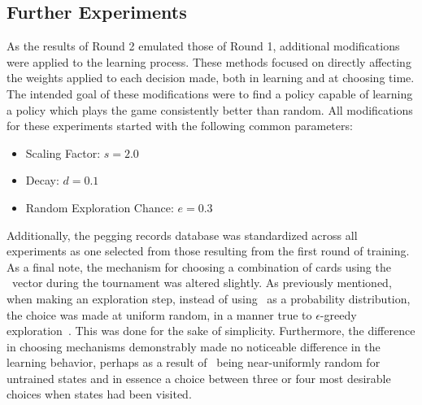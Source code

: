 

\subsection{Further Experiments}
\label{sec:findings-expts}

As the results of Round 2 emulated those of Round 1,
additional modifications were applied to the learning process.
%
These methods focused on directly affecting the weights applied to each
decision made,
both in learning and at choosing time.
%
The intended goal of these modifications were to find a policy
capable of learning a policy which plays the game consistently better than
random.
%
All modifications for these experiments started with the following common
parameters:
\begin{itemize}
	\item Scaling Factor: $s = 2.0$
	\item Decay: $d = 0.1$
	\item Random Exploration Chance: $e = 0.3$
\end{itemize}
%
Additionally,
the pegging records database was standardized across all experiments
as one selected from those resulting from the first round of training.
%
As a final note,
the mechanism for choosing a combination of cards using the \pvec\ vector 
during the tournament was altered slightly.
%
As previously mentioned,
when making an exploration step,
instead of using \pvec\ as a probability distribution,
the choice was made at uniform random,
in a manner true to $\epsilon$-greedy exploration~\cite{rl_book}.
%
This was done for the sake of simplicity.
%
Furthermore,
the difference in choosing mechanisms demonstrably
made no noticeable difference in the learning behavior,
perhaps as a result of \pvec\ being near-uniformly random for untrained states
and in essence a choice between three or four most desirable choices when
states had been visited.

%













